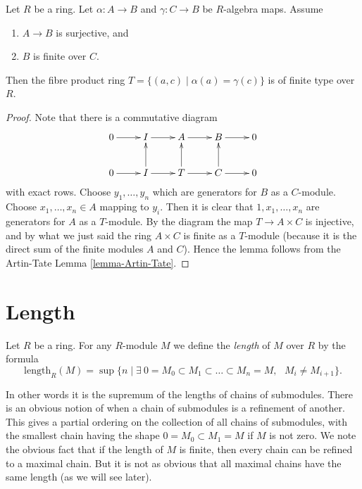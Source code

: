 \begin{lemma}
\label{lemma-fibre-product-finite-type}
Let $R$ be a ring.
Let $\alpha : A \to B$ and $\gamma : C \to B$ be $R$-algebra maps.
Assume
\begin{enumerate}
\item $A \to B$ is surjective, and
\item $B$ is finite over $C$.
\end{enumerate}
Then the fibre product ring $T = \{(a, c) \mid \alpha(a) = \gamma(c)\}$
is of finite type over $R$.
\end{lemma}

\begin{proof}
Note that there is a commutative diagram
$$
\xymatrix{
0 \ar[r] &
I \ar[r] &
A \ar[r] &
B \ar[r] &
0 \\
0 \ar[r] &
I \ar[r] \ar[u] &
T \ar[r] \ar[u] &
C \ar[r] \ar[u] &
0
}
$$
with exact rows. Choose $y_1, \ldots, y_n$ which are generators for
$B$ as a $C$-module. Choose $x_1, \ldots, x_n \in A$ mapping to $y_i$.
Then it is clear that $1, x_1, \ldots, x_n$ are generators for
$A$ as a $T$-module. By the diagram the map
$T \to A \times C$ is injective, and by what we just said the
ring $A \times C$ is finite as a $T$-module (because it is the
direct sum of the finite modules $A$ and $C$).
Hence the lemma follows from the Artin-Tate Lemma \ref{lemma-Artin-Tate}.
\end{proof}






















\section{Length}
\label{section-length}

\begin{definition}
\label{definition-length}
Let $R$ be a ring. For any $R$-module $M$
we define the {\it length} of $M$ over $R$ by the
formula
$$
\text{length}_R(M)
=
\sup
\{
n
\mid
\exists\ 0 = M_0 \subset M_1 \subset \ldots \subset M_n = M,
\text{ }M_i \not= M_{i + 1}
\}.
$$
\end{definition}

\noindent
In other words it is the supremum of the lengths of chains
of submodules. There is an obvious notion of when a chain
of submodules is a refinement of another. This gives a partial
ordering on the collection of all chains of submodules,
with the smallest chain having the shape $0 = M_0 \subset M_1 = M$
if $M$ is not zero.
We note the obvious fact that if the length of
$M$ is finite, then every chain can be refined to a
maximal chain. But it is not as obvious that all maximal
chains have the same length (as we will see later).

